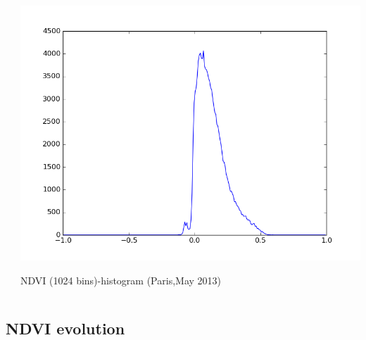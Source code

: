 \documentclass[c]{beamer}
\begin{document}
\begin{frame}
\begin{columns}
\begin{column}{0.33\textwidth}
 \end{column}
 \begin{column}{0.33\textwidth}
  \begin{overlayarea}{\linewidth}{2cm}
  \centering\vfill
  \includegraphics[scale=0.12]{images/Paris/05_ndvi_histo.png}
  \end{overlayarea}
  \begin{overlayarea}{\linewidth}{0.5cm}
  \centering
  \tiny NDVI (1024 bins)-histogram (Paris,May 2013) \par
  \end{overlayarea}
 \end{column}
\end{columns}

\end{frame}

\subsection{NDVI evolution}
\begin{frame}
\tableofcontents[currentsubsection]
\end{frame}
\end{document}
